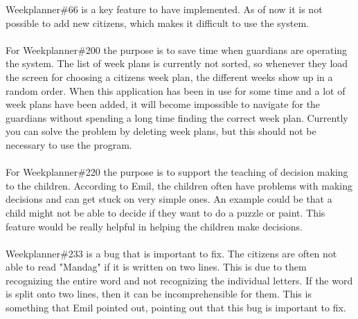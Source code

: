 \noindent
Weekplanner\#66 is a key feature to have implemented. 
As of now it is not possible to add new citizens, which makes it difficult to use the system. 
\\\\
For Weekplanner\#200 the purpose is to save time when guardians are operating the system. 
The list of week plans is currently not sorted, so whenever they load the screen for choosing a citizens week plan, the different weeks show up in a random order. 
When this application has been in use for some time and a lot of week plans have been added, it will become impossible to navigate for the guardians without spending a long time finding the correct week plan.
Currently you can solve the problem by deleting week plans, but this should not be necessary to use the program.
\\\\
For Weekplanner\#220 the purpose is to support the teaching of decision making to the children.
According to Emil, the children often have problems with making decisions and can get stuck on very simple ones. 
An example could be that a child might not be able to decide if they want to do a puzzle or paint.
This feature would be really helpful in helping the children make decisions.
\\\\
Weekplanner\#233 is a bug that is important to fix.
The citizens are often not able to read "Mandag" if it is written on two lines. 
This is due to them recognizing the entire word and not recognizing the individual letters. 
If the word is split onto two lines, then it can be incomprehensible for them.
This is something that Emil pointed out, pointing out that this bug is important to fix.

